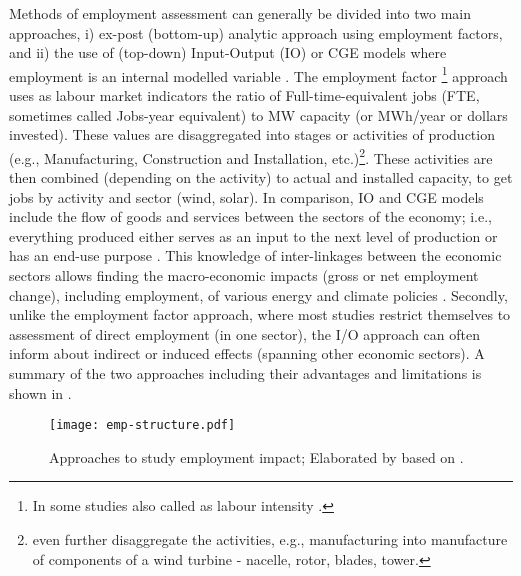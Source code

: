 \documentclass[../thesis.tex]{subfiles}
\begin{document}
Methods of employment assessment can generally be divided into two main approaches, i) ex-post (bottom-up) analytic approach using employment factors, and ii) the use of (top-down) Input-Output (IO) or CGE models where employment is an internal modelled variable \citep{kammen2004,breitschopf2012}. The employment factor \footnote{In some studies also called as labour intensity \citep{simas2014,lambert2012}.} approach uses as labour market indicators the ratio of Full-time-equivalent jobs (FTE, sometimes called Jobs-year equivalent) to MW capacity (or MWh/year or dollars invested). These values are disaggregated into stages or activities of production (e.g., Manufacturing, Construction and Installation, etc.)\footnote{\citet{simas2014} even further disaggregate the activities, e.g., manufacturing into manufacture of components of a wind turbine - nacelle, rotor, blades, tower. }. These activities are then combined (depending on the activity) to actual and installed capacity, to get jobs by activity and sector (wind, solar). In comparison, IO and CGE models include the flow of goods and services between the  sectors of the economy; i.e., everything produced either serves as an input to the next level of production or has an end-use purpose \citep{irenaRenewableEnergyJobs2014}. This knowledge of inter-linkages between the economic sectors allows finding the macro-economic impacts (gross or net employment change), including employment, of various energy and climate policies  \citep{lambert2012}. 
Secondly, unlike the employment factor approach, where most studies restrict themselves to assessment of direct employment (in one sector), the I/O approach can often inform about indirect or induced effects (spanning other economic sectors). A summary of the two approaches including their advantages and limitations is shown in .

\begin{figure}[h]
\centering
\texttt{[image: emp-structure.pdf]}
\caption{Approaches to study employment impact; Elaborated by \citet{irenaRenewableEnergyJobs2014} based on \citet{breitschopf2012}.}
\label{fig:emp-structure}
\end{figure}
\end{document}
